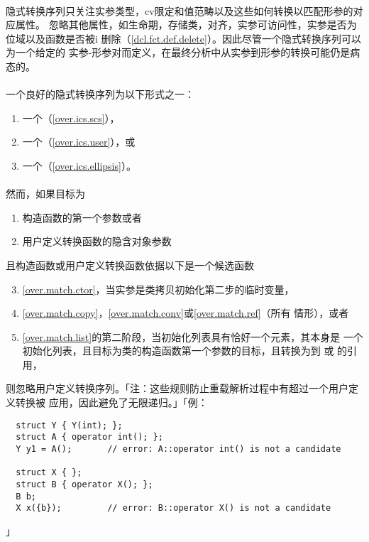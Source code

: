\paragraph{}
隐式转换序列只关注实参类型，cv限定和值范畴以及这些如何转换以匹配形参的对应属性。
忽略其他属性，如生命期，存储类，对齐，实参可访问性，实参是否为位域以及函数是否被i
删除（\ref{dcl.fct.def.delete}）。因此尽管一个隐式转换序列可以为一个给定的
实参-形参对而定义，在最终分析中从实参到形参的转换可能仍是病态的。

\paragraph{}
一个良好的隐式转换序列为以下形式之一：
\begin{enumerate}
  \item{一个（\ref{over.ics.scs}），}
  \item{一个（\ref{over.ics.user}），或}
  \item{一个（\ref{over.ics.ellipsis}）。}
\end{enumerate}

\paragraph{}
然而，如果目标为
\begin{enumerate}
  \item{构造函数的第一个参数或者}
  \item{用户定义转换函数的隐含对象参数}
\end{enumerate}
且构造函数或用户定义转换函数依据以下是一个候选函数
\begin{enumerate}
  \setcounter{enumi}{2}
  \item{\ref{over.match.ctor}，当实参是类拷贝初始化第二步的临时变量，}
  \item{\ref{over.match.copy}，\ref{over.match.conv}或\ref{over.match.ref}（所有
    情形），或者}
  \item{\ref{over.match.list}的第二阶段，当初始化列表具有恰好一个元素，其本身是
    一个初始化列表，且目标为类的构造函数第一个参数的目标，且转换为到
    或 的引用，}
\end{enumerate}
则忽略用户定义转换序列。「注：这些规则防止重载解析过程中有超过一个用户定义转换被
应用，因此避免了无限递归。」「例：
\begin{lstlisting}
  struct Y { Y(int); };
  struct A { operator int(); };
  Y y1 = A();       // error: A::operator int() is not a candidate

  struct X { };
  struct B { operator X(); };
  B b;
  X x({b});         // error: B::operator X() is not a candidate
\end{lstlisting}」

